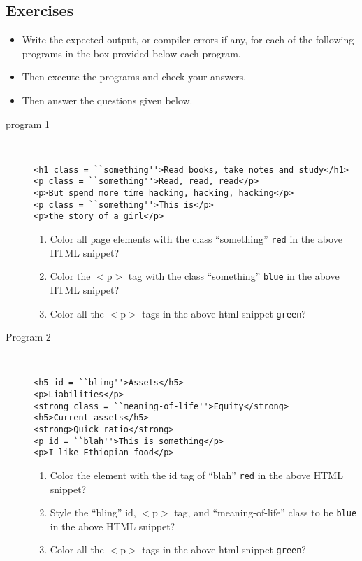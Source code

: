 \documentclass[11pt,a4paper]{article}
\def\AnswerBox{\fbox{\begin{minipage}{4in}\hfill\vspace{0.5in}\end{minipage}}}
\begin{document}
\subsection*{Exercises}
\begin{itemize}
\item Write the expected output, or compiler errors if any, for each of the following programs in the box provided below each program.
\item Then execute the programs and check your answers.
\item Then answer the questions given below.
\end{itemize}
\begin{description}
\item[program 1]\
\begin{lstlisting}
<h1 class = ``something''>Read books, take notes and study</h1>
<p class = ``something''>Read, read, read</p>
<p>But spend more time hacking, hacking, hacking</p>
<p class = ``something''>This is</p>
<p>the story of a girl</p>
\end{lstlisting}
\AnswerBox

\begin{enumerate}[label=\bfseries Q\arabic*:]\itemsep10pt
\item Color all page elements with the class ``something'' \texttt{red} in the above HTML snippet?
\item Color the $<$p$>$ tag with the class ``something'' \texttt{blue} in the above HTML snippet?
\item Color all the $<$p$>$ tags in the above html snippet \texttt{green}?
\end{enumerate}

\item[Program 2]\
\begin{lstlisting}
<h5 id = ``bling''>Assets</h5>
<p>Liabilities</p>
<strong class = ``meaning-of-life''>Equity</strong>
<h5>Current assets</h5>
<strong>Quick ratio</strong>
<p id = ``blah''>This is something</p>
<p>I like Ethiopian food</p>
\end{lstlisting}
\AnswerBox
\begin{enumerate}[label=\bfseries Q\arabic*:]\itemsep10pt
\item Color the element with the id tag of ``blah'' \texttt{red} in the above HTML snippet?
\item Style the ``bling'' id, $<$p$>$ tag, and ``meaning-of-life'' class to be \texttt{blue} in the above HTML snippet?
\item Color all the $<$p$>$ tags in the above html snippet \texttt{green}?
\end{enumerate}



\end{description}
\end{document}
